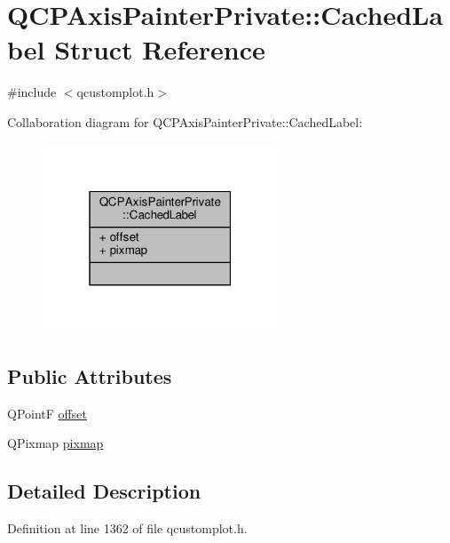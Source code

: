 \hypertarget{struct_q_c_p_axis_painter_private_1_1_cached_label}{}\section{Q\+C\+P\+Axis\+Painter\+Private\+:\+:Cached\+Label Struct Reference}
\label{struct_q_c_p_axis_painter_private_1_1_cached_label}


{\ttfamily \#include $<$qcustomplot.\+h$>$}



Collaboration diagram for Q\+C\+P\+Axis\+Painter\+Private\+:\+:Cached\+Label\+:\nopagebreak
\begin{figure}[H]
\begin{center}
\leavevmode
\includegraphics[width=199pt]{struct_q_c_p_axis_painter_private_1_1_cached_label__coll__graph}
\end{center}
\end{figure}
\subsection*{Public Attributes}
\begin{DoxyCompactItemize}
\item 
Q\+Point\+F \hyperlink{struct_q_c_p_axis_painter_private_1_1_cached_label_a5f502db71c92e572f1e6f44f62c59d8e}{offset}
\item 
Q\+Pixmap \hyperlink{struct_q_c_p_axis_painter_private_1_1_cached_label_a461597cbd470914a9d24b64d16037a88}{pixmap}
\end{DoxyCompactItemize}


\subsection{Detailed Description}


Definition at line 1362 of file qcustomplot.\+h.



